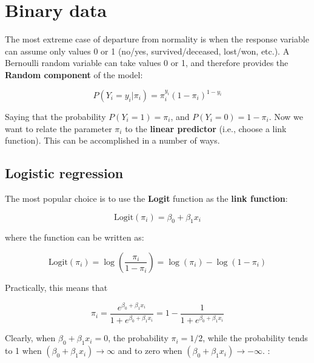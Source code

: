 \documentclass[
  letterpaper,
  DIV=11,
  numbers=noendperiod]{scrreprt}
\begin{document}
\hypertarget{binary-data}{%
\section{Binary data}\label{binary-data}}

The most extreme case of departure from normality is when the response
variable can assume only values 0 or 1 (no/yes, survived/deceased,
lost/won, etc.). A Bernoulli random variable can take values 0 or 1, and
therefore provides the \textbf{Random component} of the model:

\[
P(Y_i = y_i | \pi_i) = \pi_i^{y_i} (1 - \pi_i)^{1 - y_i}
\]

Saying that the probability \(P(Y_i = 1) = \pi_i\), and
\(P(Y_i = 0) = 1 - \pi_i\). Now we want to relate the parameter
\(\pi_i\) to the \textbf{linear predictor} (i.e., choose a link
function). This can be accomplished in a number of ways.

\hypertarget{logistic-regression}{%
\subsection{Logistic regression}\label{logistic-regression}}

The most popular choice is to use the \textbf{Logit} function as the
\textbf{link function}:

\[
\text{Logit}(\pi_i) = \beta_0 + \beta_1 x_i 
\]

where the function can be written as:

\[
\text{Logit}(\pi_i) = \log\left( \frac{\pi_i}{1 - \pi_i} \right) = \log(\pi_i) - \log(1 - \pi_i)
\]

Practically, this means that

\[
\pi_i = \frac{e^{\beta_0 + \beta_1 x_i}}{1 + e^{\beta_0 + \beta_1 x_i}} = 1 - \frac{1}{1 + e^{\beta_0 + \beta_1 x_i}}
\]

Clearly, when \(\beta_0 + \beta_1 x_i = 0\), the probability
\(\pi_i = 1/2\), while the probability tends to 1 when
\((\beta_0 + \beta_1 x_i) \to \infty\) and to zero when
\((\beta_0 + \beta_1 x_i) \to -\infty\). :
\end{document}
